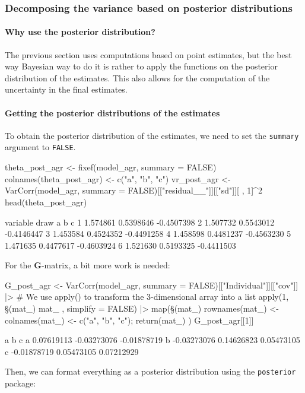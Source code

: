 \documentclass[a4paper,12pt,twoside]{article}
\begin{document}
\subsubsection{Decomposing the variance based on posterior distributions}

\paragraph{Why use the posterior distribution?}
The previous section uses computations based on point estimates, but the best way Bayesian way to do it is rather to apply the functions on the posterior distribution of the estimates. This also allows for the computation of the uncertainty in the final estimates.

\paragraph{Getting the posterior distributions of the estimates}
To obtain the posterior distribution of the estimates, we need to set the \texttt{summary} argument to \texttt{FALSE}.
\begin{Rinput}
theta_post_agr <- fixef(model_agr, summary = FALSE)
colnames(theta_post_agr) <- c("a", "b", "c")
vr_post_agr <-
    VarCorr(model_agr, summary = FALSE)[["residual__"]][["sd"]][ , 1]^2
head(theta_post_agr)
\end{Rinput}
\begin{Routput}
    variable
draw        a         b          c
   1 1.574861 0.5398646 -0.4507398
   2 1.507732 0.5543012 -0.4146447
   3 1.453584 0.4524352 -0.4491258
   4 1.458598 0.4481237 -0.4563230
   5 1.471635 0.4477617 -0.4603924
   6 1.521630 0.5193325 -0.4411503
\end{Routput}
For the $\mathbf{G}$-matrix, a bit more work is needed:
\begin{Rinput}
G_post_agr <-
    VarCorr(model_agr, summary = FALSE)[["Individual"]][["cov"]] |>
    # We use apply() to transform the 3-dimensional array into a list
    apply(1, \§§(mat_) { mat_ }, simplify = FALSE) |>
    map(\§§(mat_) { rownames(mat_) <- colnames(mat_) <- c("a", "b", "c"); return(mat_) })
G_post_agr[[1]]
\end{Rinput}
\begin{Routput}
            a           b           c
a  0.07619113 -0.03273076 -0.01878719
b -0.03273076  0.14626823  0.05473105
c -0.01878719  0.05473105  0.07212929
\end{Routput}
Then, we can format everything as a posterior distribution using the \texttt{posterior} package:
\end{document}
